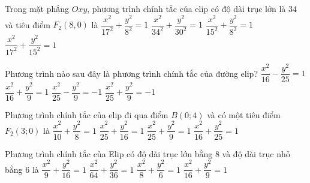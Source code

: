\begin{ex}%
	Trong mặt phẳng $O  x y$, phương trình chính tắc của elip có độ dài trục lớn là $ 34 $ và tiêu điểm $F_2(8,0)$ là
	 \choice
		 {$\dfrac{x^2}{17^2}+\dfrac{y^2}{8^2}=1$}
		{$\dfrac{x^2}{34^2}+\dfrac{y^2}{30^2}=1$} 
		 {$\dfrac{x^2}{15^2}+\dfrac{y^2}{8^2}=1$}
		 {\True$\dfrac{x^2}{17^2}+\dfrac{y^2}{15^2}=1$}
\end{ex}

\begin{ex}%
	Phương trình nào sau đây là phương trình chính tắc của đường  elip?
	\choice 
		{$\dfrac{x^2}{16}-\dfrac{y^2}{25}=1$} 
		{\True $\dfrac{x^2}{16}+\dfrac{y^2}9=1$} 
		{$\dfrac{x^2}{25}-\dfrac{y^2}9=-1$} 
		 {$\dfrac{x^2}{25}+\dfrac{y^2}9=-1$}
\end{ex}

\begin{ex}%
	Phương trình chính tắc của elip đi qua điểm $B(0;4)$ và có một tiêu  điểm $F_2(3;0)$ là
	 \choice
		 {$\dfrac{x^2}{10}+\dfrac{y^2}{8}=1$}
		{\True $\dfrac{x^2}{25}+\dfrac{y^2}{16}=1$} 
		{$\dfrac{x^2}{25}+\dfrac{y^2}{9}=1$} 
		 {$\dfrac{x^2}{16}+\dfrac{y^2}{25}=1$}
\end{ex}

\begin{ex}%
	Phương trình chính tắc của Elip có độ dài trục lớn bằng $8$ và  độ dài trục nhỏ bằng $6$ là
	\choice 
		 {$\dfrac{x^2}{9}+\dfrac{y^2}{16}=1$}
		{$\dfrac{x^2}{64}+\dfrac{y^2}{36}=1$} 
		 {$\dfrac{x^2}{8}+\dfrac{y^2}{6}=1$}
		{$\dfrac{x^2}{16}+\dfrac{y^2}{9}=1$} 
\end{ex}

